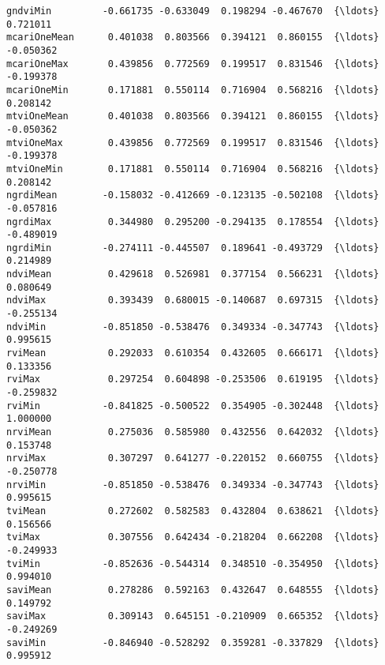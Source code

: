 \documentclass[11pt]{article}
\begin{document}
\begin{Verbatim}[commandchars=\\\{\}]
gndviMin         -0.661735 -0.633049  0.198294 -0.467670  {\ldots}  0.721011
mcariOneMean      0.401038  0.803566  0.394121  0.860155  {\ldots} -0.050362
mcariOneMax       0.439856  0.772569  0.199517  0.831546  {\ldots} -0.199378
mcariOneMin       0.171881  0.550114  0.716904  0.568216  {\ldots}  0.208142
mtviOneMean       0.401038  0.803566  0.394121  0.860155  {\ldots} -0.050362
mtviOneMax        0.439856  0.772569  0.199517  0.831546  {\ldots} -0.199378
mtviOneMin        0.171881  0.550114  0.716904  0.568216  {\ldots}  0.208142
ngrdiMean        -0.158032 -0.412669 -0.123135 -0.502108  {\ldots} -0.057816
ngrdiMax          0.344980  0.295200 -0.294135  0.178554  {\ldots} -0.489019
ngrdiMin         -0.274111 -0.445507  0.189641 -0.493729  {\ldots}  0.214989
ndviMean          0.429618  0.526981  0.377154  0.566231  {\ldots}  0.080649
ndviMax           0.393439  0.680015 -0.140687  0.697315  {\ldots} -0.255134
ndviMin          -0.851850 -0.538476  0.349334 -0.347743  {\ldots}  0.995615
rviMean           0.292033  0.610354  0.432605  0.666171  {\ldots}  0.133356
rviMax            0.297254  0.604898 -0.253506  0.619195  {\ldots} -0.259832
rviMin           -0.841825 -0.500522  0.354905 -0.302448  {\ldots}  1.000000
nrviMean          0.275036  0.585980  0.432556  0.642032  {\ldots}  0.153748
nrviMax           0.307297  0.641277 -0.220152  0.660755  {\ldots} -0.250778
nrviMin          -0.851850 -0.538476  0.349334 -0.347743  {\ldots}  0.995615
tviMean           0.272602  0.582583  0.432804  0.638621  {\ldots}  0.156566
tviMax            0.307556  0.642434 -0.218204  0.662208  {\ldots} -0.249933
tviMin           -0.852636 -0.544314  0.348510 -0.354950  {\ldots}  0.994010
saviMean          0.278286  0.592163  0.432647  0.648555  {\ldots}  0.149792
saviMax           0.309143  0.645151 -0.210909  0.665352  {\ldots} -0.249269
saviMin          -0.846940 -0.528292  0.359281 -0.337829  {\ldots}  0.995912


\end{Verbatim}
\end{document}
